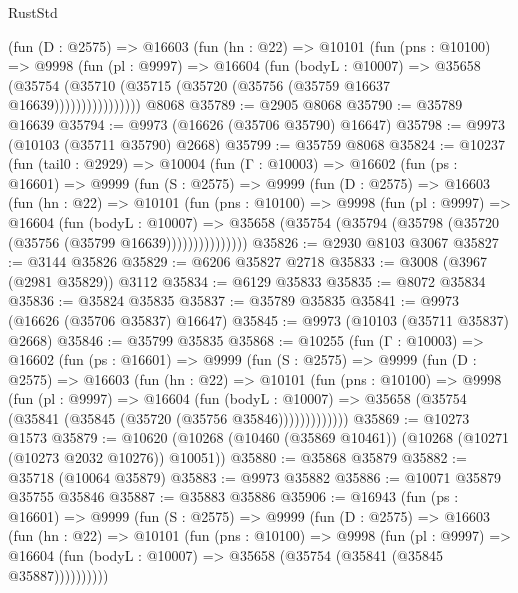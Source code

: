 \begin{lexlean}{RustStd}
\begin{coremodule}
              (fun (D : @2575) =>
              @16603
                (fun (hn : @22) =>
                @10101
                  (fun (pns : @10100) =>
                  @9998
                    (fun (pl : @9997) =>
                    @16604
                      (fun (bodyL : @10007) =>
                      @35658
                        (@35754
                          (@35710 (@35715 (@35720 (@35756 (@35759 @16637 @16639))))))))))))))))
    @8068
@35789 := @2905 @8068
@35790 := @35789 @16639
@35794 := @9973 (@16626 (@35706 @35790) @16647)
@35798 := @9973 (@10103 (@35711 @35790) @2668)
@35799 := @35759 @8068
@35824 := @10237
    (fun (tail0 : @2929) =>
    @10004
      (fun (Γ : @10003) =>
      @16602
        (fun (ps : @16601) =>
        @9999
          (fun (S : @2575) =>
          @9999
            (fun (D : @2575) =>
            @16603
              (fun (hn : @22) =>
              @10101
                (fun (pns : @10100) =>
                @9998
                  (fun (pl : @9997) =>
                  @16604
                    (fun (bodyL : @10007) =>
                    @35658 (@35754 (@35794 (@35798 (@35720 (@35756 (@35799 @16639)))))))))))))))
@35826 := @2930 @8103 @3067
@35827 := @3144 @35826
@35829 := @6206 @35827 @2718
@35833 := @3008 (@3967 (@2981 @35829)) @3112
@35834 := @6129 @35833
@35835 := @8072 @35834
@35836 := @35824 @35835
@35837 := @35789 @35835
@35841 := @9973 (@16626 (@35706 @35837) @16647)
@35845 := @9973 (@10103 (@35711 @35837) @2668)
@35846 := @35799 @35835
@35868 := @10255
    (fun (Γ : @10003) =>
    @16602
      (fun (ps : @16601) =>
      @9999
        (fun (S : @2575) =>
        @9999
          (fun (D : @2575) =>
          @16603
            (fun (hn : @22) =>
            @10101
              (fun (pns : @10100) =>
              @9998
                (fun (pl : @9997) =>
                @16604
                  (fun (bodyL : @10007) =>
                  @35658 (@35754 (@35841 (@35845 (@35720 (@35756 @35846)))))))))))))
@35869 := @10273 @1573
@35879 := @10620 (@10268 (@10460 (@35869 @10461)) (@10268 (@10271 (@10273 @2032 @10276)) @10051))
@35880 := @35868 @35879
@35882 := @35718 (@10064 @35879)
@35883 := @9973 @35882
@35886 := @10071 @35879 @35755 @35846
@35887 := @35883 @35886
@35906 := @16943
    (fun (ps : @16601) =>
    @9999
      (fun (S : @2575) =>
      @9999
        (fun (D : @2575) =>
        @16603
          (fun (hn : @22) =>
          @10101
            (fun (pns : @10100) =>
            @9998
              (fun (pl : @9997) =>
              @16604 (fun (bodyL : @10007) => @35658 (@35754 (@35841 (@35845 @35887))))))))))

\end{coremodule}
\end{lexlean}
